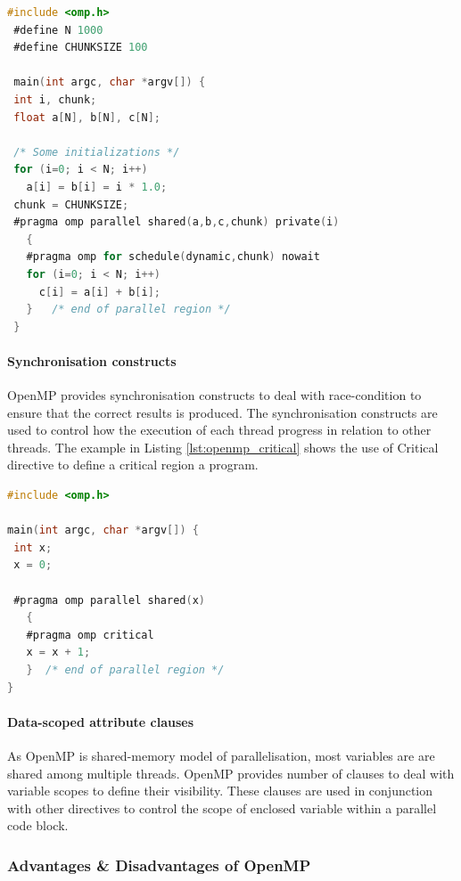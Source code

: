 \begin{lstlisting}[language=C, caption={An example of Work-sharing "for" loop construct.}, label={lst:openmp_for}]
 #include <omp.h>
 #define N 1000
 #define CHUNKSIZE 100

 main(int argc, char *argv[]) {
 int i, chunk;
 float a[N], b[N], c[N];

 /* Some initializations */
 for (i=0; i < N; i++)
   a[i] = b[i] = i * 1.0;
 chunk = CHUNKSIZE;
 #pragma omp parallel shared(a,b,c,chunk) private(i)
   {
   #pragma omp for schedule(dynamic,chunk) nowait
   for (i=0; i < N; i++)
     c[i] = a[i] + b[i];
   }   /* end of parallel region */ 
 }
\end{lstlisting}

\paragraph{Synchronisation constructs}
OpenMP provides synchronisation constructs to deal with race-condition to ensure that the correct results is produced. The synchronisation constructs are used to control how the execution of each thread progress in relation to other threads. The example in Listing \ref{lst:openmp_critical} shows the use of Critical directive to define a critical region a program. \citep{Barney:16-openmp}

\begin{lstlisting}[language=C, caption={An example of Critical directive construct.}, label={lst:openmp_critical}]
#include <omp.h>

main(int argc, char *argv[]) {
 int x;
 x = 0;
 
 #pragma omp parallel shared(x) 
   {
   #pragma omp critical 
   x = x + 1;
   }  /* end of parallel region */
}
 \end{lstlisting}

\paragraph{Data-scoped attribute clauses}
As OpenMP is shared-memory model of parallelisation, most variables are are shared among multiple threads. OpenMP provides number of clauses to deal with variable scopes to define their visibility. These clauses are used in conjunction with other directives to control the scope of enclosed variable within a parallel code block. \citep{Barney:16-openmp}

\subsubsection{Advantages \& Disadvantages of OpenMP}
